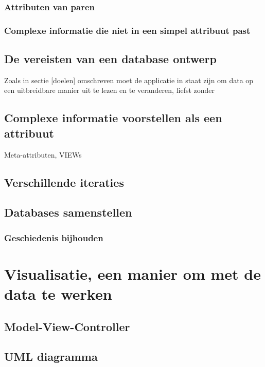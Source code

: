\subsubsection{Attributen van paren}

\subsubsection{Complexe informatie die niet in een simpel attribuut past}

\subsection{De vereisten van een database ontwerp}
Zoals in sectie [doelen] omschreven moet de applicatie in staat zijn om data op een uitbreidbare manier uit te lezen en te veranderen, liefst zonder 

\subsection{Complexe informatie voorstellen als een attribuut}
Meta-attributen, VIEWs

\subsection{Verschillende iteraties}

\subsection{Databases samenstellen}

\subsubsection{Geschiedenis bijhouden}

\section{Visualisatie, een manier om met de data te werken}

\subsection{Model-View-Controller}

\subsection{UML diagramma}

